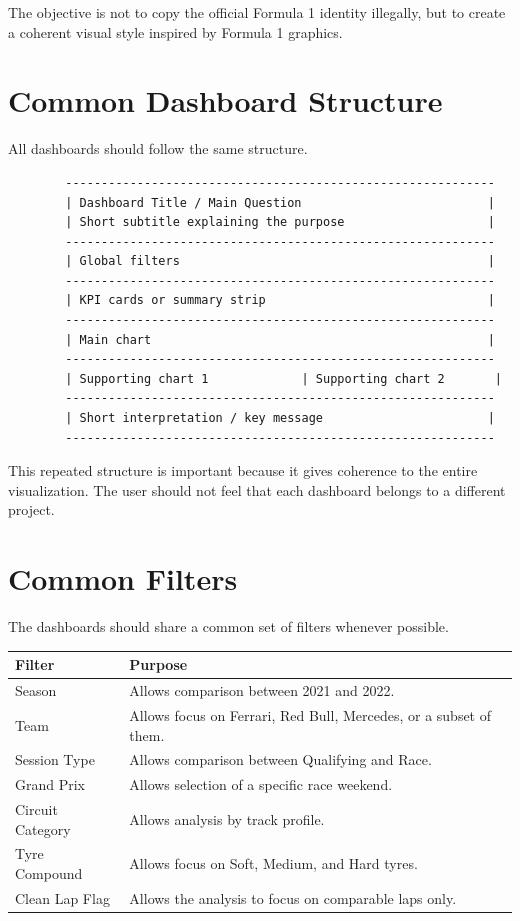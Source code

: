 \documentclass[12pt,a4paper]{article}
\begin{document}
	The objective is not to copy the official Formula 1 identity illegally, but to create a coherent visual style inspired by Formula 1 graphics.
	
	\section{Common Dashboard Structure}
	
	All dashboards should follow the same structure.
	
	\begin{verbatim}
		------------------------------------------------------------
		| Dashboard Title / Main Question                          |
		| Short subtitle explaining the purpose                    |
		------------------------------------------------------------
		| Global filters                                           |
		------------------------------------------------------------
		| KPI cards or summary strip                               |
		------------------------------------------------------------
		| Main chart                                               |
		------------------------------------------------------------
		| Supporting chart 1             | Supporting chart 2       |
		------------------------------------------------------------
		| Short interpretation / key message                       |
		------------------------------------------------------------
	\end{verbatim}
	
	This repeated structure is important because it gives coherence to the entire visualization.
	The user should not feel that each dashboard belongs to a different project.
	
	\section{Common Filters}
	
	The dashboards should share a common set of filters whenever possible.
	
	\begin{longtable}{p{4cm} p{10cm}}
		\toprule
		\textbf{Filter} & \textbf{Purpose} \\
		\midrule
		Season & Allows comparison between 2021 and 2022. \\
		Team & Allows focus on Ferrari, Red Bull, Mercedes, or a subset of them. \\
		Session Type & Allows comparison between Qualifying and Race. \\
		Grand Prix & Allows selection of a specific race weekend. \\
		Circuit Category & Allows analysis by track profile. \\
		Tyre Compound & Allows focus on Soft, Medium, and Hard tyres. \\
		Clean Lap Flag & Allows the analysis to focus on comparable laps only. \\
		\bottomrule
	\end{longtable}
	
\end{document}
